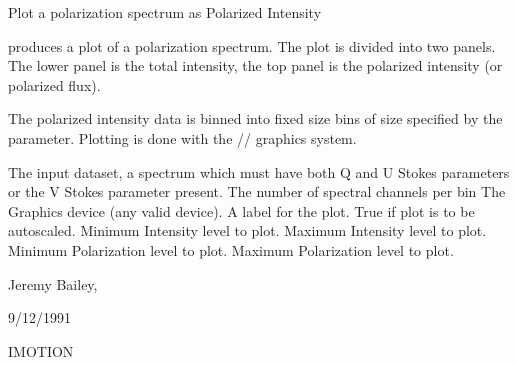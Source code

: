 \begin{manroutinedescription}
        Plot a polarization spectrum as Polarized Intensity

        {} produces a plot of a polarization spectrum. The plot is
        divided into two panels. The lower panel is the total intensity,
        the top panel is the polarized intensity (or polarized flux).

        The polarized intensity data is binned into fixed size bins of
        size specified by the {} parameter. Plotting is done %
with the
        {}/{}/{} graphics system.

\begin{manparametertable}
  The input %
dataset, a spectrum which must
                               have both Q and U Stokes parameters or
                               the V Stokes parameter present.
  The number of spectral %
channels per bin
   The Graphics device (any %
valid {} device).
     A label for the plot.
  True if plot is to be autoscaled.
     Minimum Intensity level to plot.
     Maximum Intensity level to plot.
     Minimum Polarization level to %
plot.
     Maximum Polarization level to %
plot.

\end{manparametertable}
         Jeremy Bailey, {}

         9/12/1991

\end{manroutinedescription}
%
{IMOTION}
